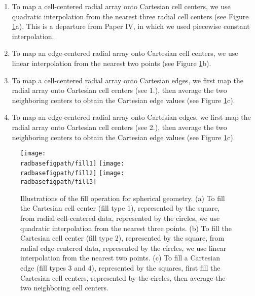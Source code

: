 \begin{enumerate}
\item To map a cell-centered radial array onto Cartesian cell centers,
      we use quadratic interpolation from the nearest 
      three radial cell centers (see Figure \ref{Fig:fill}a).
      This is a departure from Paper IV, in which we used 
      piecewise constant interpolation.  
\item To map an edge-centered radial array onto Cartesian cell centers, 
      we use linear interpolation from the nearest two points
      (see Figure \ref{Fig:fill}b).
\item To map a cell-centered radial array onto Cartesian edges,
      we first map the radial array onto Cartesian cell centers (see 1.), 
      then average the two neighboring centers to obtain the Cartesian edge values
      (see Figure \ref{Fig:fill}c).
\item To map an edge-centered radial array onto Cartesian edges,
      we first map the radial array onto Cartesian cell centers (see 2.), 
      then average the two neighboring centers to obtain the Cartesian edge values
      (see Figure \ref{Fig:fill}c).
\end{enumerate}

\begin{figure}[tpb]
\centering
\texttt{[image: \\radbasefigpath/fill1]}\hspace{0.1in}
\texttt{[image: \\radbasefigpath/fill2]}\hspace{0.1in}
\texttt{[image: \\radbasefigpath/fill3]}
\caption{\label{Fig:fill} Illustrations of the fill operation for
  spherical geometry.  (a) To fill the Cartesian cell center (fill
  type 1), represented by the square, from radial cell-centered data,
  represented by the circles, we use quadratic interpolation from the
  nearest three points.  (b) To fill the Cartesian cell center
  (fill type 2), represented by the square, from radial edge-centered
  data, represented by the circles, we use linear interpolation from
  the nearest two points. (c) To fill a Cartesian edge (fill
  types 3 and 4), represented by the squares, first fill the 
  Cartesian cell centers, represented by the circles, then average
  the two neighboring cell centers.}
\end{figure}
